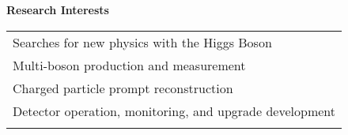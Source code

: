 \documentclass[letterpaper,11pt,oneside]{article}
\begin{document}
 \raggedright
 \textbf{\Large{Research Interests} }\\
 \normalsize
 \begin{flushleft}
 \begin{tabular}{@{} l}
     Searches for new physics with the Higgs Boson \\
     Multi-boson production and measurement \\
     Charged particle prompt reconstruction \\
     Detector operation, monitoring, and upgrade development\\
     \\
      \end{tabular}
\end{flushleft}
\end{document}
